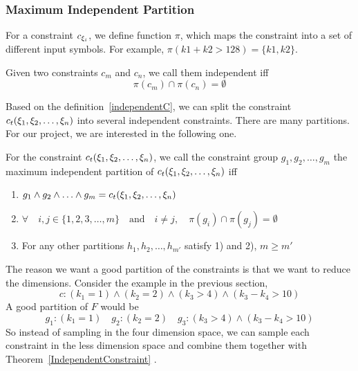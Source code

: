 \subsubsection{Maximum Independent Partition}

For a constraint $c_{{\xi}_{i}}$, we define function $\pi$, which maps
the constraint into a set of different input symbols. For example, 
$\pi(k1 + k2 > 128) = \{k1, k2\}$.

\begin{mydef}[]
      \label{independentC}
      Given two constraints $c_m$ and $c_n$, we call them independent iff 
      $$\pi(c_m) \cap \pi(c_n) = \emptyset$$
\end{mydef}

Based on the definition~\ref{independentC}, we can split
the constraint $c_t({\xi}_{1},{\xi}_{2},\ldots,{\xi}_{n})$ into several 
independent constraints. There are many partitions. For our project, 
we are interested in the following one.

\begin{mydef}\label{Goodpartition}
   For the constraint $c_t({\xi}_{1},{\xi}_{2},\ldots,{\xi}_{n})$,
   we call the constraint group
   $g_{1}, g_{2}, \ldots, g_{m}$
   the maximum independent partition of $c_t({\xi}_{1},{\xi}_{2},\ldots,{\xi}_{n})$ iff
   \begin{enumerate}
      \item $g_{1} \land g_{2} \land \ldots \land g_{m} = c_t({\xi}_{1},{\xi}_{2},\ldots,{\xi}_{n})$
      \item $\forall \quad i, j \in \{1, 2, 3, \ldots, m\} \quad \textrm{and} \quad 
            i \neq j, \quad \pi(g_{i}) \cap \pi(g_{j}) = \emptyset $
      \item For any other partitions  $h_{1}, h_{2}, \ldots, h_{m'}$ satisfy 1) and
            2), $m \geq m'$    
   \end{enumerate}
   
\end{mydef}

The reason we want a good partition of the constraints is that we want to 
reduce the dimensions. Consider the example in the previous section,
$$c: ({k_1} = 1)\land({k_2} = 2)\land({k_3} > 4)\land({k_3} - {k_4} > 10)$$
A good partition of $F$ would be
$$g_{1}: ({k_1} = 1)\quad g_{2}: ({k_2} = 2)\quad g_{3}: ({k_3} > 4) \land ({k_3} - {k_4} > 10)$$     
So instead of sampling in the four dimension space, we can
sample each constraint in the less dimension space and combine them
together with Theorem~\ref{IndependentConstraint} .

